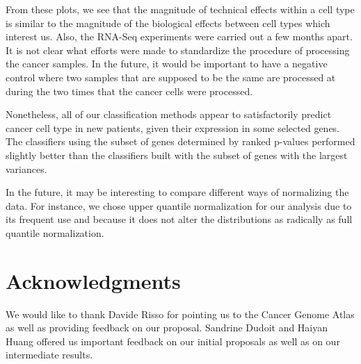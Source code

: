 From these plots, we see that the magnitude of technical effects within a cell
type is similar to the magnitude of the biological effects between cell types
which interest us. Also, the RNA-Seq experiments were carried out a few months
apart. It is not clear what efforts were made to standardize the procedure of
processing the cancer samples. In the future, it would be important to have a
negative control where two samples that are supposed to be the same are
processed at during the two times that the cancer cells were processed. 

Nonetheless, all of our classification methods appear to satisfactorily predict
cancer cell type in new patients, given their expression in some selected
genes. The classifiers using the subset of genes determined by ranked p-values
performed slightly better than the classifiers built with the subset of genes
with the largest variances.

In the future,  it may be interesting to compare different ways of normalizing
the data. For instance, we chose upper quantile normalization for our analysis
due to its frequent use and because it does not alter the distributions as
radically as full quantile normalization.


\section*{Acknowledgments}

We would like to thank Davide Risso for pointing us to the Cancer Genome Atlas
as well as providing feedback on our proposal. Sandrine Dudoit and Haiyan Huang
offered us important feedback on our initial proposals as well as on our
intermediate results. 




